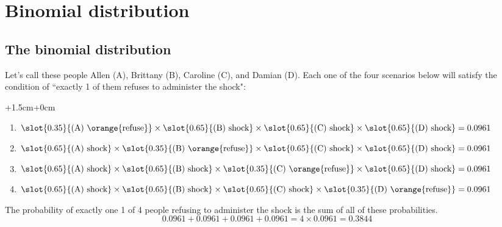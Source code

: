 \documentclass[slidestop,compress,mathserif]{beamer}
\begin{document}

\section{Binomial distribution}


\subsection{The binomial distribution}


\begin{frame}

\pause
Let's call these people Allen (A), Brittany (B), Caroline (C), and Damian (D). Each one of the four scenarios below will satisfy the condition of ``exactly 1 of them refuses to administer the shock": \\
\vspace{0.25cm}
\pause
\begin{changemargin}{+1.5cm}{+0cm}
{\footnotesize
\begin{enumerate}
\item[Scenario 1:] $\slot{0.35}{\text{(A) \orange{refuse}}} \times \slot{0.65}{\text{(B) shock}} \times \slot{0.65}{\text{(C) shock}} \times \slot{0.65}{\text{(D) shock}} = 0.0961$
\pause
\item[Scenario 2:] $\slot{0.65}{\text{(A) shock}} \times \slot{0.35}{\text{(B) \orange{refuse}}}\times \slot{0.65}{\text{(C) shock}} \times \slot{0.65}{\text{(D) shock}} = 0.0961$
\pause
\item[Scenario 3:] $\slot{0.65}{\text{(A) shock}} \times \slot{0.65}{\text{(B) shock}} \times \slot{0.35}{\text{(C) \orange{refuse}}}\times \slot{0.65}{\text{(D) shock}} = 0.0961$
\pause
\item[Scenario 4:] $\slot{0.65}{\text{(A) shock}} \times \slot{0.65}{\text{(B) shock}} \times \slot{0.65}{\text{(C) shock}} \times \slot{0.35}{\text{(D) \orange{refuse}}} = 0.0961$
\end{enumerate}
}
\end{changemargin}
\pause
The probability of exactly one 1 of 4 people refusing to administer the shock is the sum of all of these probabilities.
\[ 0.0961+ 0.0961 + 0.0961 + 0.0961 = 4 \times 0.0961 = 0.3844 \]

\end{frame}
\end{document}
